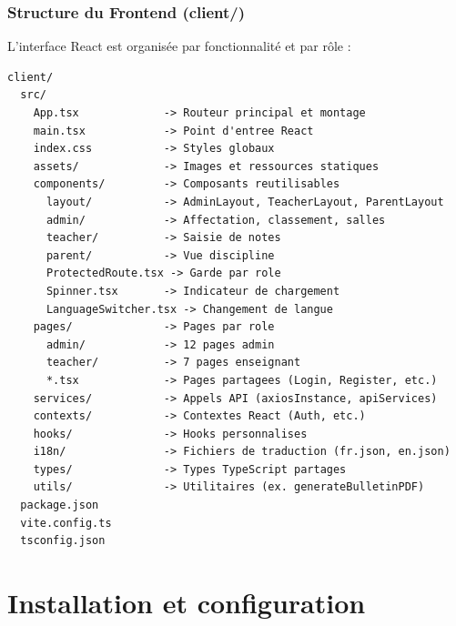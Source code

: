 \documentclass[12pt,a4paper]{report}
\begin{document}
\subsection*{Structure du Frontend (client/)}
L'interface React est organisée par fonctionnalité et par rôle :

\begin{lstlisting}
client/
  src/
    App.tsx             -> Routeur principal et montage
    main.tsx            -> Point d'entree React
    index.css           -> Styles globaux
    assets/             -> Images et ressources statiques
    components/         -> Composants reutilisables
      layout/           -> AdminLayout, TeacherLayout, ParentLayout
      admin/            -> Affectation, classement, salles
      teacher/          -> Saisie de notes
      parent/           -> Vue discipline
      ProtectedRoute.tsx -> Garde par role
      Spinner.tsx       -> Indicateur de chargement
      LanguageSwitcher.tsx -> Changement de langue
    pages/              -> Pages par role
      admin/            -> 12 pages admin
      teacher/          -> 7 pages enseignant
      *.tsx             -> Pages partagees (Login, Register, etc.)
    services/           -> Appels API (axiosInstance, apiServices)
    contexts/           -> Contextes React (Auth, etc.)
    hooks/              -> Hooks personnalises
    i18n/               -> Fichiers de traduction (fr.json, en.json)
    types/              -> Types TypeScript partages
    utils/              -> Utilitaires (ex. generateBulletinPDF)
  package.json
  vite.config.ts
  tsconfig.json
\end{lstlisting}
 
\chapter{Installation et configuration}
 
\end{document}
